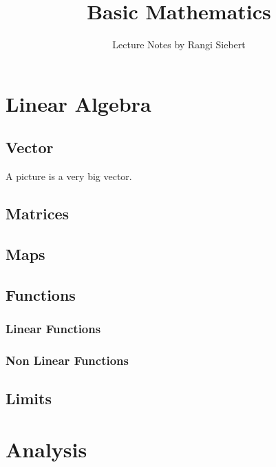 \documentclass[twocolumn]{article}
\begin{document}
\title{Basic Mathematics}
\author{Lecture Notes by Rangi Siebert}
\maketitle
\tableofcontents

\section{Linear Algebra}
	\subsection{Vector}
		A picture is a very big vector.
	\subsection{Matrices}
	\subsection{Maps}
	\subsection{Functions}
		\subsubsection{Linear Functions}
		\subsubsection{Non Linear Functions}
	\subsection{Limits}
		
\section{Analysis}
		
\end{document}
